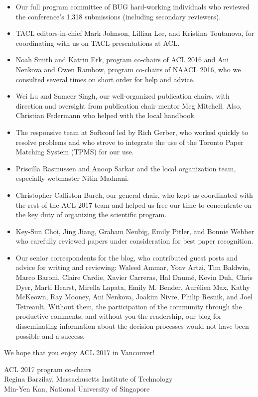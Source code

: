 \begin{itemize}
\item Our full program committee of BUG hard-working individuals who
  reviewed the conference’s 1,318 submissions (including secondary
  reviewers).
\item TACL editors-in-chief Mark Johnson, Lillian Lee, and Kristina
  Toutanova, for coordinating with us on TACL presentations at ACL.
\item Noah Smith and Katrin Erk, program co-chairs of ACL 2016 and Ani
  Nenkova and Owen Rambow, program co-chairs of NAACL 2016, who we
  consulted several times on short order for help and advice.
\item Wei Lu and Sameer Singh, our well-organized publication chairs,
  with direction and oversight from publication chair mentor Meg
  Mitchell.  Also, Christian Federmann who helped with the local
  handbook.
\item The responsive team at Softconf led by Rich Gerber, who worked
  quickly to resolve problems and who strove to integrate the use of
  the Toronto Paper Matching System (TPMS) for our use.
\item Priscilla Rasmussen and Anoop Sarkar and the local organization
  team, especially webmaster Nitin Madnani.
\item Christopher Calliston-Burch, our general chair, who kept us
  coordinated with the rest of the ACL 2017 team and helped us free
  our time to concentrate on the key duty of organizing the scientific
  program.
\item Key-Sun Choi, Jing Jiang, Graham Neubig, Emily Pitler, and
  Bonnie Webber who carefully reviewed papers under consideration for
  best paper recognition.
\item Our senior correspondents for the blog, who contributed guest
  posts and advice for writing and reviewing: Waleed Ammar, Yoav
  Artzi, Tim Baldwin, Marco Baroni, Claire Cardie, Xavier Carreras,
  Hal Daumé, Kevin Duh, Chris Dyer, Marti Hearst, Mirella Lapata,
  Emily M. Bender, Aurélien Max, Kathy McKeown, Ray Mooney, Ani
  Nenkova, Joakim Nivre, Philip Resnik, and Joel Tetreault.  Without
  them, the participation of the community through the productive
  comments, and without you the readership, our blog for disseminating
  information about the decision processes would not have been
  possible and a success.
\end{itemize}

We hope that you enjoy ACL 2017 in Vancouver!

\noindent ACL 2017 program co-chairs\\
Regina Barzilay, Massachusetts Institute of Technology\\
Min-Yen Kan, National University of Singapore
